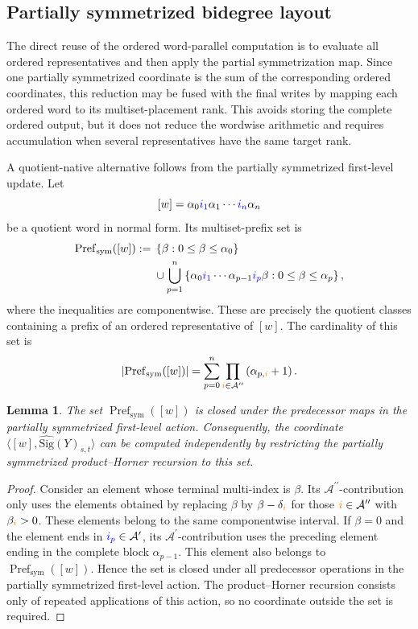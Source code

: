 \documentclass{amsart}
\newtheorem{lemma}[theorem]{Lemma}
\theoremstyle{definition}
\theoremstyle{remark}
\newcommand{\Sigsym}[1]{\widehat{\mathrm{Sig}}(#1)}
\newcommand{\blue}[1]{{\color{blue}#1}}
\newcommand{\orange}[1]{{\color{orange}#1}}
\begin{document}
\subsection{Partially symmetrized bidegree layout}

The direct reuse of the ordered word-parallel computation is to evaluate
all ordered representatives and then apply the partial symmetrization map.
Since one partially symmetrized coordinate is the sum of the corresponding
ordered coordinates, this reduction may be fused with the final writes by
mapping each ordered word to its multiset-placement rank. This avoids
storing the complete ordered output, but it does not reduce the wordwise
arithmetic and requires accumulation when several representatives have the
same target rank.

A quotient-native alternative follows from the partially symmetrized
first-level update. Let
\[
    [w]
    =
    \alpha_0\blue{i_1}\alpha_1\cdots
    \blue{i_n}\alpha_n
\]
be a quotient word in normal form. Its multiset-prefix set is
\[
\begin{aligned}
    \operatorname{Pref}_{\mathrm{sym}}([w])
    :={}&
    \left\{
        \beta:
        0\leq\beta\leq\alpha_0
    \right\}
    \\
    &\cup
    \bigcup_{p=1}^{n}
    \left\{
        \alpha_0\blue{i_1}\cdots
        \alpha_{p-1}\blue{i_p}\beta:
        0\leq\beta\leq\alpha_p
    \right\},
\end{aligned}
\]
where the inequalities are componentwise. These are precisely the quotient
classes containing a prefix of an ordered representative of $[w]$. The
cardinality of this set is
\[
    \left|
        \operatorname{Pref}_{\mathrm{sym}}([w])
    \right|
    =
    \sum_{p=0}^{n}
    \prod_{\orange{i}\in\mathcal{A}^{\prime\prime}}
    \left(
        \alpha_{p,\orange{i}}+1
    \right).
\]

\begin{lemma}
\label{lem:symmetrized_prefix_closure}
The set $\operatorname{Pref}_{\mathrm{sym}}([w])$ is closed under the
predecessor maps in the partially symmetrized first-level action.
Consequently, the coordinate
$\langle[w],\Sigsym{Y}_{s,t}\rangle$ can be computed independently by
restricting the partially symmetrized product--Horner recursion to this set.
\end{lemma}

\begin{proof}
Consider an element whose terminal multi-index is $\beta$. Its
$\mathcal{A}^{\prime\prime}$-contribution only uses the elements obtained
by replacing $\beta$ by
$\beta-\delta_{\orange{i}}$ for those
$\orange{i}\in\mathcal{A}^{\prime\prime}$ with
$\beta_{\orange{i}}>0$. These elements belong to the same componentwise
interval. If $\beta=0$ and the element ends in
$\blue{i_p}\in\mathcal{A}^{\prime}$, its
$\mathcal{A}^{\prime}$-contribution uses the preceding element ending in
the complete block $\alpha_{p-1}$. This element also belongs to
$\operatorname{Pref}_{\mathrm{sym}}([w])$. Hence the set is closed under
all predecessor operations in the partially symmetrized first-level action.
The product--Horner recursion consists only of repeated applications of
this action, so no coordinate outside the set is required.
\end{proof}
\end{document}
